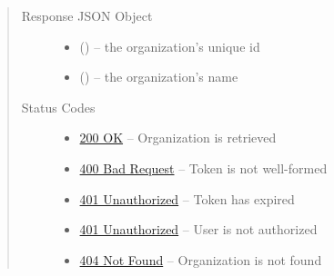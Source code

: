 \documentclass[letterpaper,10pt,english]{sphinxmanual}
\begin{document}
\begin{fulllineitems}
\begin{quote}
\begin{description}
\begin{itemize}
\end{itemize}

\item[{Response JSON Object}] \leavevmode\begin{itemize}
\item {} 
 () -- the organization's unique id

\item {} 
 () -- the organization's name

\end{itemize}

\item[{Status Codes}] \leavevmode\begin{itemize}
\item {} 
\href{http://www.w3.org/Protocols/rfc2616/rfc2616-sec10.html\#sec10.2.1}{200 OK} -- Organization is retrieved

\item {} 
\href{http://www.w3.org/Protocols/rfc2616/rfc2616-sec10.html\#sec10.4.1}{400 Bad Request} -- Token is not well-formed

\item {} 
\href{http://www.w3.org/Protocols/rfc2616/rfc2616-sec10.html\#sec10.4.2}{401 Unauthorized} -- Token has expired

\item {} 
\href{http://www.w3.org/Protocols/rfc2616/rfc2616-sec10.html\#sec10.4.2}{401 Unauthorized} -- User is not authorized

\item {} 
\href{http://www.w3.org/Protocols/rfc2616/rfc2616-sec10.html\#sec10.4.5}{404 Not Found} -- Organization is not found

\end{itemize}

\end{description}\end{quote}

\end{fulllineitems}
\end{document}
